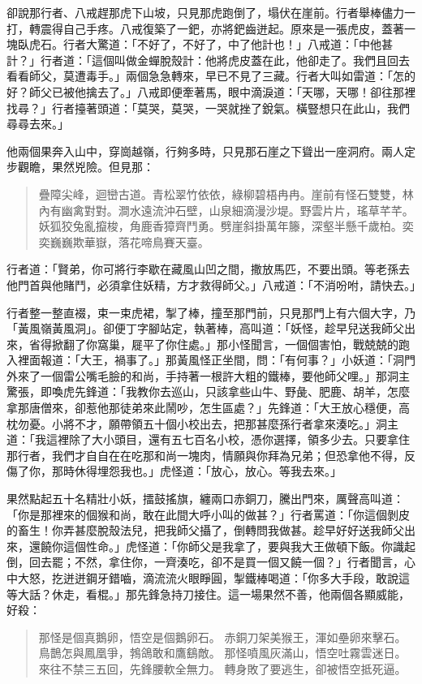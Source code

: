 卻說那行者、八戒趕那虎下山坡，只見那虎跑倒了，塌伏在崖前。行者舉棒儘力一打，轉震得自己手疼。八戒復築了一鈀，亦將鈀齒迸起。原來是一張虎皮，蓋著一塊臥虎石。行者大驚道：「不好了，不好了，中了他計也！」八戒道：「中他甚計？」行者道：「這個叫做金蟬脫殼計：他將虎皮蓋在此，他卻走了。我們且回去看看師父，莫遭毒手。」兩個急急轉來，早已不見了三藏。行者大叫如雷道：「怎的好？師父已被他擒去了。」八戒即便牽著馬，眼中滴淚道：「天哪，天哪！卻往那裡找尋？」行者擡著頭道：「莫哭，莫哭，一哭就挫了銳氣。橫豎想只在此山，我們尋尋去來。」

他兩個果奔入山中，穿崗越嶺，行夠多時，只見那石崖之下聳出一座洞府。兩人定步觀瞻，果然兇險。但見那：
\begin{quote}
疊障尖峰，迴巒古道。青松翠竹依依，綠柳碧梧冉冉。崖前有怪石雙雙，林內有幽禽對對。澗水遠流沖石壁，山泉細滴漫沙堤。野雲片片，瑤草芊芊。妖狐狡兔亂攛梭，角鹿香獐齊鬥勇。劈崖斜掛萬年籐，深壑半懸千歲柏。奕奕巍巍欺華嶽，落花啼鳥賽天臺。
\end{quote}

行者道：「賢弟，你可將行李歇在藏風山凹之間，撒放馬匹，不要出頭。等老孫去他門首與他賭鬥，必須拿住妖精，方才救得師父。」八戒道：「不消吩咐，請快去。」

行者整一整直裰，束一束虎裙，掣了棒，撞至那門前，只見那門上有六個大字，乃「黃風嶺黃風洞」。卻便丁字腳站定，執著棒，高叫道：「妖怪，趁早兒送我師父出來，省得掀翻了你窩巢，屣平了你住處。」那小怪聞言，一個個害怕，戰兢兢的跑入裡面報道：「大王，禍事了。」那黃風怪正坐間，問：「有何事？」小妖道：「洞門外來了一個雷公嘴毛臉的和尚，手持著一根許大粗的鐵棒，要他師父哩。」那洞主驚張，即喚虎先鋒道：「我教你去巡山，只該拿些山牛、野彘、肥鹿、胡羊，怎麼拿那唐僧來，卻惹他那徒弟來此鬧吵，怎生區處？」先鋒道：「大王放心穩便，高枕勿憂。小將不才，願帶領五十個小校出去，把那甚麼孫行者拿來湊吃。」洞主道：「我這裡除了大小頭目，還有五七百名小校，憑你選擇，領多少去。只要拿住那行者，我們才自自在在吃那和尚一塊肉，情願與你拜為兄弟；但恐拿他不得，反傷了你，那時休得埋怨我也。」虎怪道：「放心，放心。等我去來。」

果然點起五十名精壯小妖，擂鼓搖旗，纏兩口赤銅刀，騰出門來，厲聲高叫道：「你是那裡來的個猴和尚，敢在此間大呼小叫的做甚？」行者罵道：「你這個剝皮的畜生！你弄甚麼脫殼法兒，把我師父攝了，倒轉問我做甚。趁早好好送我師父出來，還饒你這個性命。」虎怪道：「你師父是我拿了，要與我大王做頓下飯。你識起倒，回去罷；不然，拿住你，一齊湊吃，卻不是買一個又饒一個？」行者聞言，心中大怒，扢迸迸鋼牙錯嚙，滴流流火眼睜圓，掣鐵棒喝道：「你多大手段，敢說這等大話？休走，看棍。」那先鋒急持刀接住。這一場果然不善，他兩個各顯威能，好殺：
\begin{quote}
那怪是個真鵝卵，悟空是個鵝卵石。
赤銅刀架美猴王，渾如壘卵來擊石。
鳥鵲怎與鳳凰爭，鵓鴿敢和鷹鷂敵。
那怪噴風灰滿山，悟空吐霧雲迷日。
來往不禁三五回，先鋒腰軟全無力。
轉身敗了要逃生，卻被悟空抵死逼。
\end{quote}

